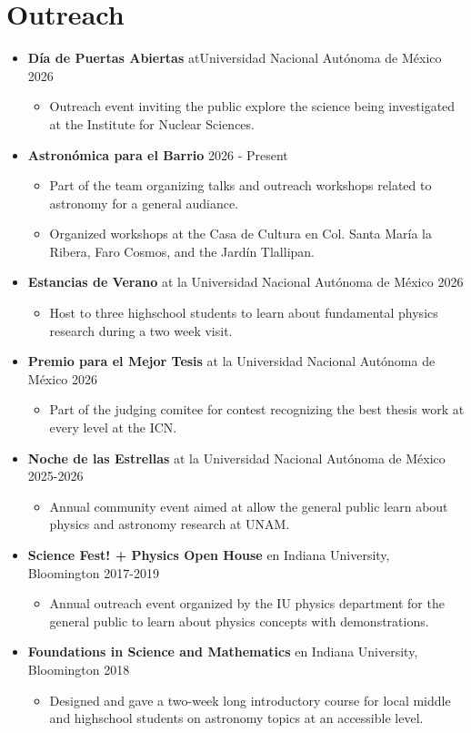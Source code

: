 \documentclass[letterpaper,11pt]{article}
\newcommand{\outerlist}[1]{
    \begin{itemize}[leftmargin=*] #1 \end{itemize}}
\newcommand{\innerlist}[1]{
    \begin{itemize}[topsep=0pt] #1 \end{itemize}}
\newcommand{\entry}[1]{\item\small{#1}}
\begin{document}

\section{Outreach}
\outerlist{
    \entry{\textbf{Día de Puertas Abiertas} atUniversidad Nacional Autónoma de México \hfill 2026}
        \innerlist{
        \entry{Outreach event inviting the public explore the science being investigated at the Institute for Nuclear Sciences.}
        }
    \entry{\textbf{Astronómica para el Barrio} \hfill 2026 - Present}
        \innerlist{
            \entry{Part of the team organizing talks and outreach workshops related to astronomy for a general audiance. }
            \entry{Organized workshops at the Casa de Cultura en Col. Santa María la Ribera, Faro Cosmos, and the Jardín Tlallipan.}
        }
    \entry{\textbf{Estancias de Verano} at la Universidad Nacional Autónoma de México \hfill 2026}
        \innerlist{
            \entry{Host to three highschool students to learn about fundamental physics research during a two week visit.}
        }
    \entry{\textbf{Premio para el Mejor Tesis} at la Universidad Nacional Autónoma de México \hfill 2026}
        \innerlist{
            \entry{Part of the judging comitee for contest recognizing the best thesis work at every level at the ICN.}
        }
    \entry{\textbf{Noche de las Estrellas} at la Universidad Nacional Autónoma de México \hfill 2025-2026}
        \innerlist{
            \entry{Annual community event aimed at allow the general public learn about physics and astronomy research at UNAM. }
        }
    \entry{\textbf{Science Fest! + Physics Open House} en Indiana University, Bloomington \hfill 2017-2019}
        \innerlist{
            \entry{Annual outreach event organized by the IU physics department for the general public to learn about physics concepts with demonstrations.}
        }
    \entry{\textbf{Foundations in Science and Mathematics} en Indiana University, Bloomington \hfill 2018}
        \innerlist{
            \entry{Designed and gave a two-week long introductory course for local middle and highschool students on astronomy topics at an accessible level.}
        }
}
\end{document}
